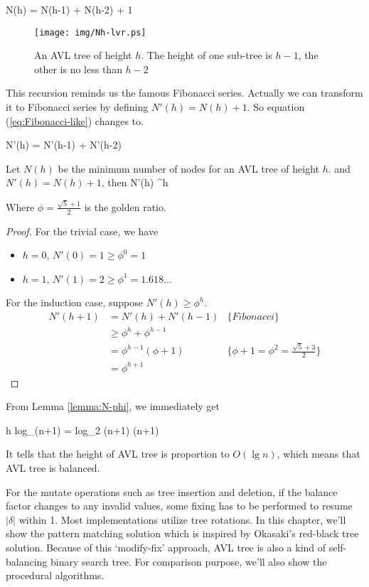 \documentclass{article}
\begin{document}
\be
  N(h) = N(h-1) + N(h-2) + 1
  \label{eq:Fibonacci-like}
\ee

\begin{figure}[htbp]
   \centering
   \texttt{[image: img/Nh-lvr.ps]}
   \caption{An AVL tree of height $h$. The height of one sub-tree is $h-1$, the other is no less than $h-2$} \label{fig:N-h-relation}
\end{figure}

This recursion reminds us the famous Fibonacci series. Actually we can
transform it to Fibonacci series by defining $N'(h) = N(h)+1$. So equation
(\ref{eq:Fibonacci-like}) changes to.

\be
  N'(h) = N'(h-1) + N'(h-2)
\ee

\begin{lemma}
\label{lemma:N-phi}
Let $N(h)$ be the minimum number of nodes for an AVL tree of
height $h$. and $N'(h) = N(h) + 1$, then
\be
  N'(h) \geq \phi^h
\ee

Where $\phi = \frac{\sqrt{5}+1}{2}$ is the golden ratio.
\end{lemma}

\begin{proof}
For the trivial case, we have
\begin{itemize}
\item $h=0$, $N'(0) = 1 \geq \phi^0 = 1$
\item $h=1$, $N'(1) = 2 \geq \phi^1 = 1.618...$
\end{itemize}

For the induction case, suppose $N'(h) \geq \phi^h$.
\[
  \begin{array}{lll}
  N'(h+1) & = N'(h) + N'(h-1) & \{Fibonacci\} \\
          & \geq \phi^h + \phi^{h-1} & \\
          & = \phi^{h-1}(\phi + 1) & \{\phi + 1 = \phi^2 = \frac{\sqrt{5}+3}{2}\} \\
          & = \phi^{h+1}
 \end{array}
\]
\end{proof}

From Lemma \ref{lemma:N-phi}, we immediately get

\be
  h \leq log_{\phi}(n+1) = log_{\phi}2 \cdot \lg (n+1)  \lg (n+1)
  \label{eq:AVL-height}
\ee

It tells that the height of AVL tree is proportion to $O(\lg n)$, which
means that AVL tree is balanced.

For the mutate operations such as tree insertion and deletion,
if the balance factor changes to any invalid values, some fixing has
to be performed to resume $|\delta|$ within 1. Most implementations utilize
tree rotations. In this chapter, we'll show the pattern matching solution
which is inspired by Okasaki's red-black tree solution\cite{okasaki}.
Because of this `modify-fix' approach, AVL tree is also a kind of
self-balancing binary search tree. For comparison purpose, we'll also
show the procedural algorithms.
\end{document}
